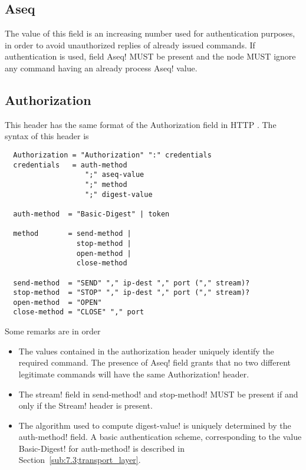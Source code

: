\subsection{Aseq}
\label{subsub:7.1.3;transport_layer}

The value of this field is an increasing number used for
authentication purposes, in order to avoid unauthorized replies of
already issued commands.  If authentication is used, field \ttt Aseq!
MUST be present and the node MUST ignore any command having an already
process \ttt Aseq! value.

\subsection{Authorization}
\label{subsub:7.1.0;transport_layer}

This header has the same format of the Authorization field in HTTP
\cite[Section~14.8]{rfc2616}.  The syntax of this header is

\begin{verbatim}
  Authorization = "Authorization" ":" credentials
  credentials   = auth-method 
                   ";" aseq-value 
                   ";" method 
                   ";" digest-value

  auth-method  = "Basic-Digest" | token

  method       = send-method |
                 stop-method |
                 open-method |
                 close-method

  send-method  = "SEND" "," ip-dest "," port ("," stream)?
  stop-method  = "STOP" "," ip-dest "," port ("," stream)?
  open-method  = "OPEN"
  close-method = "CLOSE" "," port
\end{verbatim}

Some remarks are in order

\begin{itemize}
  \item
    The values contained in the authorization header uniquely identify
    the required command.  The presence of \ttt Aseq! field grants
    that no two different legitimate commands will have the same \ttt
    Authorization! header.
  \item
    The \ttt stream! field in \ttt send-method! and  \ttt stop-method!
    MUST be present if and only if the \ttt Stream! header is present.
  \item
    The algorithm used to compute \ttt digest-value! is uniquely
    determined by the \ttt auth-method! field.  A basic authentication
    scheme, corresponding to the value \ttt Basic-Digest! for \ttt
    auth-method! is described in Section~\ref{sub:7.3;transport_layer}.
\end{itemize}

